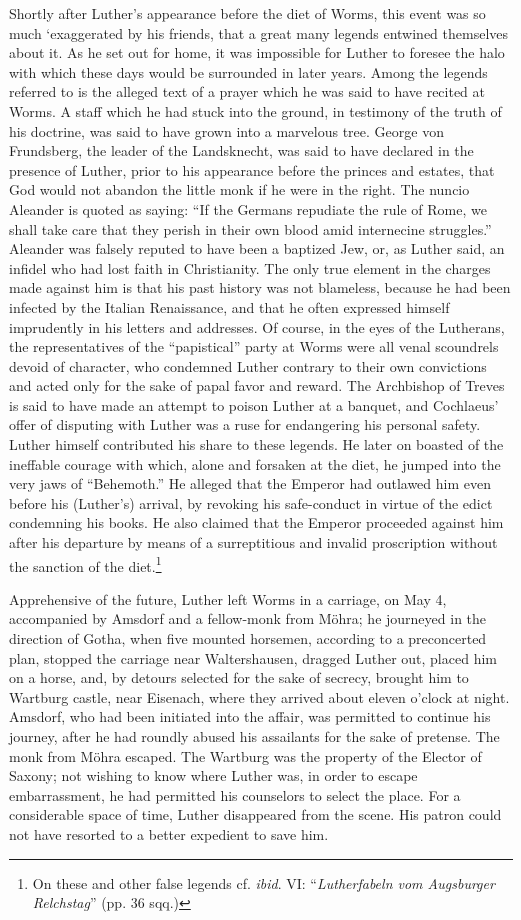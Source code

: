 Shortly after Luther’s appearance before the diet of Worms, this
event was so much ‘exaggerated by his friends, that a great many
legends entwined themselves about it. As he set out for home, it
was impossible for Luther to foresee the halo with which these days
would be surrounded in later years. Among the legends referred to is
the alleged text of a prayer which he was said to have recited at
Worms. A staff which he had stuck into the ground, in testimony of
the truth of his doctrine, was said to have grown into a marvelous tree.
George von Frundsberg, the leader of the Landsknecht, was
said to have declared in the presence of Luther, prior to his appearance
before the princes and estates, that God would not abandon
the little monk if he were in the right. The nuncio Aleander is
quoted as saying: “If the Germans repudiate the rule of Rome,
we shall take care that they perish in their own blood amid internecine
struggles.” Aleander was falsely reputed to have been a baptized
Jew, or, as Luther said, an infidel who had lost faith in Christianity.
The only true element in the charges made against him is that his
past history was not blameless, because he had been infected by
the Italian Renaissance, and that he often expressed himself imprudently
in his letters and addresses. Of course, in the eyes of the
Lutherans, the representatives of the “papistical” party at Worms
were all venal scoundrels devoid of character, who condemned
Luther contrary to their own convictions and acted only for the
sake of papal favor and reward. The Archbishop of Treves is
said to have made an attempt to poison Luther at a banquet, and
Cochlaeus’ offer of disputing with Luther was a ruse for endangering his
personal safety. Luther himself contributed his share to these
legends. He later on boasted of the ineffable courage with which,
alone and forsaken at the diet, he jumped into the very jaws of
“Behemoth.” He alleged that the Emperor had outlawed him even
before his (Luther’s) arrival, by revoking his safe-conduct in virtue
of the edict condemning his books. He also claimed that the Emperor
proceeded against him after his departure by means of a surreptitious
and invalid proscription without the sanction of the diet.\footnote
{On these and other false legends cf. \textit{ibid}. VI: “\textit{Lutherfabeln vom Augsburger
Relchstag}” (pp. 36 sqq.)}

Apprehensive of the future, Luther left Worms in a carriage, on
May 4, accompanied by Amsdorf and a fellow-monk from Möhra;
he journeyed in the direction of Gotha, when five mounted horsemen, according
to a preconcerted plan, stopped the carriage near
Waltershausen, dragged Luther out, placed him on a horse, and, by
detours selected for the sake of secrecy, brought him to Wartburg
castle, near Eisenach, where they arrived about eleven o’clock at
night. Amsdorf, who had been initiated into the affair, was permitted
to continue his journey, after he had roundly abused his
assailants for the sake of pretense. The monk from Möhra escaped.
The Wartburg was the property of the Elector of Saxony; not
wishing to know where Luther was, in order to escape embarrassment,
he had permitted his counselors to select the place. For a considerable
space of time, Luther disappeared from the scene. His patron could
not have resorted to a better expedient to save him.
